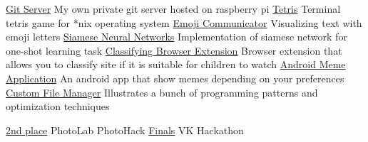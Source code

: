 \documentclass[
	a4paper,
]{fortysecondscv}
\begin{document}


\addtobacksidebar{}

\newpage
\begin{sidebar}
    \nameandjob

    \setlength{\parskip}{1ex}

\end{sidebar}

\begin{cvtable}[1.5]
        {\href{http://git.asmirnov.xyz/}
        {Git Server}}{}
        {My own private git server hosted on raspberry pi}
        {\href{https://github.com/SmirnovAlexander/Tetris}
        {Tetris}}{}
        {Terminal tetris game for *nix operating system}
        {\href{https://github.com/SmirnovAlexander/EmojiCommunicator}
        {Emoji Communicator}}{}
        {Visualizing text with emoji letters}
        {\href{https://github.com/SmirnovAlexander/OneShotLearningSiameseNetworks}
        {Siamese Neural Networks}}{}
        {Implementation of siamese network for one-shot learning task}
        {\href{https://github.com/SmirnovAlexander/WebsiteClassifier}
        {Classifying Browser Extension}}{}
        {Browser extension that allows you to classify site if it is suitable for children to watch}
        {\href{https://github.com/SmirnovAlexander/MemDer}
        {Android Meme Application}}{}
        {An android app that show memes depending on your preferences}
        {\href{https://github.com/SmirnovAlexander/SuperManager}
        {Custom File Manager}}{}
        {Illustrates a bunch of programming patterns and optimization techniques}
\end{cvtable}

\begin{cvtable}
        {\href{https://github.com/SmirnovAlexander/EmojiCommunicator}
        {2nd place}}
        {PhotoLab PhotoHack}
        {\empty}
        {\href{https://github.com/SmirnovAlexander/MemDer}
        {Finals}}
        {VK Hackathon}
        {\empty}
\end{cvtable}
\end{document}
